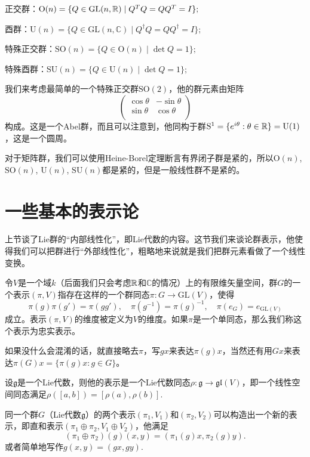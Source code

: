 \documentclass[9pt]{extarticle}
\newcommand{\cc}{\mathbb{C}}
\newcommand{\lag}{{\mathfrak{g}}}
\begin{document}
 正交群：$\mathrm{O}(n) = \{ Q \in \mathrm{GL}(n,\mathbb{R}) \mid Q^T Q = Q Q^T = I \};$

 酉群：$\mathrm{U}(n) = \{ Q \in \mathrm{GL}(n,\cc) \mid Q^\dag Q = Q Q^\dag = I \};$

 特殊正交群：$\mathrm{SO}(n) =\{ Q \in \mathrm{O}(n) \mid \det Q=1 \};$

 特殊酉群：$\mathrm{SU}(n) =\{ Q \in \mathrm{U}(n) \mid \det Q=1 \};$

我们来考虑最简单的一个特殊正交群$\mathrm{SO}(2)$，他的群元素由矩阵
\[
	\begin{pmatrix}
	\cos \theta&-\sin \theta\\
	\sin \theta&\cos \theta\\
	\end{pmatrix}
\]
构成。这是一个Abel群，而且可以注意到，他同构于群$\mathrm{S}^1=\{e^{i\theta}:\theta\in\mathbb{R}\}=\mathrm{U}(1)$，这是一个圆周。

\para 对于矩阵群，我们可以使用Heine-Borel定理断言有界闭子群是紧的，所以$\mathrm{O}(n)$, $\mathrm{SO}(n)$, $\mathrm{U}(n)$, $\mathrm{SU}(n)$都是紧的，但是一般线性群不是紧的。

\clearpage

\section{一些基本的表示论}

上节谈了Lie群的“内部线性化”，即Lie代数的内容。这节我们来谈论群表示，他使得我们可以把群进行“外部线性化”，粗略地来说就是我们把群元素看做了一个线性变换。

\para 令$V$是一个域$k$（后面我们只会考虑$\mathbb{R}$和$\cc$的情况）上的有限维矢量空间，群$G$的一个表示$(\pi, V)$指存在这样的一个群同态$\pi:G\rightarrow \mathrm{GL}(V)$，使得
\[
	\pi(g)\pi(g')=\pi(gg'),\quad \pi(g^{-1})=\pi(g)^{-1},\quad \pi(e_G)=e_{\mathrm{GL}(V)}
\]
成立。表示$(\pi, V)$的维度被定义为$V$的维度。如果$\pi$是一个单同态，那么我们称这个表示为忠实表示。

如果没什么会混淆的话，就直接略去$\pi$，写$gx$来表达$\pi(g)x$，当然还有用$Gx$来表达$\pi(G)x=\{\pi(g)x:g\in G\}$。

设$\lag$是一个Lie代数，则他的表示是一个Lie代数同态$\rho:\lag \to \mathfrak{gl}(V)$，即一个线性空间同态满足$\rho([a,b])=[\rho(a),\rho(b)]$.

\para 同一个群$G$（Lie代数$\lag$）的两个表示$(\pi_1,V_1)$和$(\pi_2,V_2)$可以构造出一个新的表示，即直和表示$(\pi_1\oplus \pi_2,V_1\oplus V_2)$，他满足
\[
	(\pi_1\oplus \pi_2)(g)(x,y)=(\pi_1(g)x,\pi_2(g)y).
\]
或者简单地写作$g(x,y)=(gx,gy)$.
\end{document}
